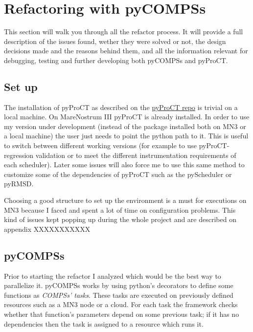 \section{Refactoring with pyCOMPSs}
\label{sec:refactor}

This section will walk you through all the refactor process. It will provide a full description of the issues found, wether they were solved or not, the design decisions made and the reasons behind them, and all the information relevant for debugging, testing and further developing both pyCOMPSs and pyProCT. 


\subsection{Set up}


The installation of pyProCT as described on the \hyperref[sec:docs]{pyProCT repo} is trivial on a local machine. On MareNostrum III pyProCT is already installed.  In order to use my version under development (instead of the package installed both on MN3 or a local machine) the user just needs to point the python path to it. This is useful to switch between different working versions (for example to use pyProCT-regression validation or to meet the different instrumentation requirements of each scheduler). Later some issues will also force me to use this same method to customize some of the dependencies of pyProCT such as the pyScheduler or pyRMSD. 

Choosing a good structure to set up the environment is a must for executions on MN3 because I faced and spent a lot of time on configuration problems. This kind of issues kept popping up during the whole project and are described on appendix XXXXXXXXXXX 



\subsection{pyCOMPSs}
\label{subsec:pycompss}

Prior to starting the refactor I analyzed which would be the best way to parallelize it. pyCOMPSs works by using python's decorators to define some functions as \textit{COMPSs' tasks}. These tasks are executed on previously defined resources such as a MN3 node or a cloud. For each task the framework checks whether that function's parameters depend on some previous task; if it has no dependencies then the task is assigned to a resource which runs it. 

